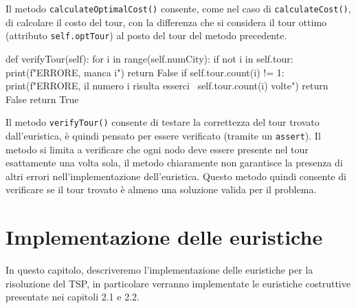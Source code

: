 \documentclass[a4paper,12pt]{report}
\begin{document}
Il metodo \lstinline!calculateOptimalCost()! consente, come nel caso di \lstinline!calculateCost()!, di calcolare il costo del tour, con la differenza che si considera il tour ottimo (attributo \lstinline!self.optTour!) al posto del tour del metodo precedente.
\begin{python}
def verifyTour(self):
  for i in range(self.numCity):
    if not i in self.tour:
      print(f"ERRORE, manca {i}")
      return False
    if self.tour.count(i) != 1:
      print(f"ERRORE, il numero {i} risulta esserci \
             {self.tour.count(i)} volte")
      return False
  return True
\end{python}
Il metodo \lstinline!verifyTour()! consente di testare la correttezza del tour trovato dall'euristica, è quindi pensato per essere verificato (tramite un \lstinline!assert!). Il metodo si limita a verificare che ogni nodo deve essere presente nel tour esattamente una volta sola, il metodo chiaramente non garantisce la presenza di altri errori nell'implementazione dell'euristica. Questo metodo quindi consente di verificare se il tour trovato è almeno una soluzione valida per il problema.

\section{Implementazione delle euristiche}
In questo capitolo, descriveremo l'implementazione delle euristiche per la risoluzione del TSP, in particolare verranno implementate le euristiche costruttive presentate nei capitoli 2.1 e 2.2.
\end{document}
